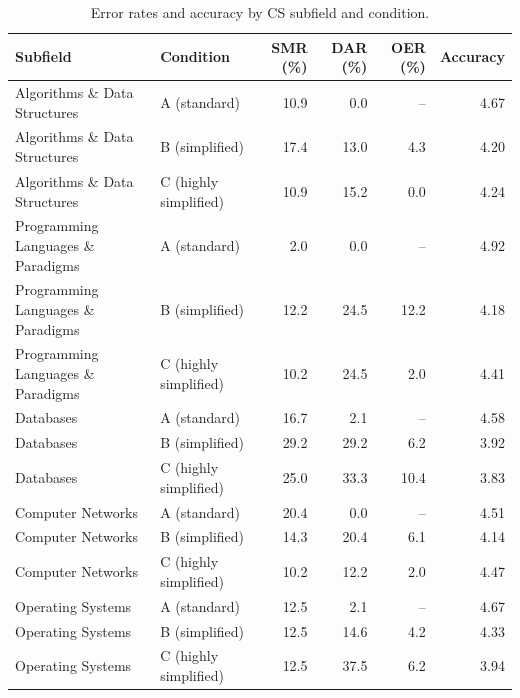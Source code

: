 \begin{table}[H]
\caption{Error rates and accuracy by CS subfield and condition.}
\label{tab:subfield}
\centering
\begin{tabular}{llrrrr}
\toprule
Subfield & Condition & SMR (\%) & DAR (\%) & OER (\%) & Accuracy \\
\midrule
Algorithms \& Data Structures & A (standard) & 10.9 & 0.0 & -- & 4.67 \\
Algorithms \& Data Structures & B (simplified) & 17.4 & 13.0 & 4.3 & 4.20 \\
Algorithms \& Data Structures & C (highly simplified) & 10.9 & 15.2 & 0.0 & 4.24 \\
Programming Languages \& Paradigms & A (standard) & 2.0 & 0.0 & -- & 4.92 \\
Programming Languages \& Paradigms & B (simplified) & 12.2 & 24.5 & 12.2 & 4.18 \\
Programming Languages \& Paradigms & C (highly simplified) & 10.2 & 24.5 & 2.0 & 4.41 \\
Databases & A (standard) & 16.7 & 2.1 & -- & 4.58 \\
Databases & B (simplified) & 29.2 & 29.2 & 6.2 & 3.92 \\
Databases & C (highly simplified) & 25.0 & 33.3 & 10.4 & 3.83 \\
Computer Networks & A (standard) & 20.4 & 0.0 & -- & 4.51 \\
Computer Networks & B (simplified) & 14.3 & 20.4 & 6.1 & 4.14 \\
Computer Networks & C (highly simplified) & 10.2 & 12.2 & 2.0 & 4.47 \\
Operating Systems & A (standard) & 12.5 & 2.1 & -- & 4.67 \\
Operating Systems & B (simplified) & 12.5 & 14.6 & 4.2 & 4.33 \\
Operating Systems & C (highly simplified) & 12.5 & 37.5 & 6.2 & 3.94 \\
\bottomrule
\end{tabular}
\end{table}

